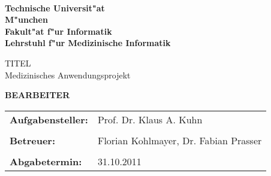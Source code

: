 %
%

  \hoffset=5mm

  

  \thispagestyle{empty}

  \begin{center}

    \bigskip \bigskip \bigskip 
    \oTUM{6.0cm} \\
    \vspace*{0.8cm}
    {\huge \bf Technische Universit"at} \\
    \bigskip
    {\huge \bf M"unchen} \\
    \bigskip \bigskip \bigskip
    {\huge \bf Fakult"at f"ur Informatik} \\
    \bigskip \bigskip
    {\Large \bf Lehrstuhl f"ur Medizinische Informatik} \\
    \bigskip \bigskip \bigskip \bigskip \bigskip

%
%
%
%

    {\Large TITEL} \\                 

    \bigskip
    \bigskip \bigskip \bigskip \bigskip
   {\Large Medizinisches Anwendungsprojekt} \\		                
    \bigskip \bigskip \bigskip \bigskip

%
%
%
%
    {\Large \bf   BEARBEITER}   

  \end{center}

  \vfill
  \begin{tabular}{ll}
%
%
%
%
    {\Large \bf Aufgabensteller:} & 
    {\Large Prof. Dr. Klaus A. Kuhn} \\             %
    \\
    {\Large \bf Betreuer:} & 
    {\Large Florian Kohlmayer, Dr. Fabian Prasser} \\             %
    \\

%
%
%
%

    {\Large \bf Abgabetermin:} & 
    {\Large 31.10.2011}                 

  \end{tabular}
  \cleardoublepage
  \hoffset=0mm
